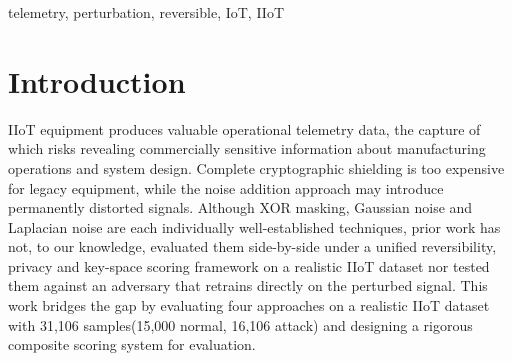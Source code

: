 \documentclass[conference]{IEEEtran}
\begin{document}
\begin{abstract}
IIoT(Industrial Internet of Things) systems constantly stream telemetry data from sensors and machinery to the cloud, posing serious privacy and security challenges. Conventional encryption methods are computationally too expensive for legacy devices. Our measurements show AES-128 requires roughly 59 - 70 times more per-packet latency than our lightweight scheme under simulated Modbus streaming conditions, while common noise-based perturbation methods irreversibly distort data. We introduce and evaluate a lightweight, fully reversible data perturbation pipeline for IIoT telemetry, contributing a composite reversibility privacy-key-space scoring framework for comparing perturbation strategies under realistic legacy-device constraints. To assess the balance between privacy and utility, a dataset comprising 31,106 IIoT intrusion detection samples covering five distinct attack categories was employed. After training a classifier that achieved a 98.47\% binary classification accuracy on original data, we evaluated four different perturbation techniques: Gaussian noise, Laplacian noise, XOR 16-bit, and XOR 64-bit against both a static and an adaptive adversary.

\end{abstract}

\begin{IEEEkeywords}
telemetry, perturbation, reversible, IoT, IIoT
\end{IEEEkeywords}

\section{Introduction}
IIoT equipment produces valuable operational telemetry data, the capture of which risks revealing commercially sensitive information about manufacturing operations and system design. Complete cryptographic shielding is too expensive for legacy equipment, while the noise addition approach may introduce permanently distorted signals. Although XOR masking, Gaussian noise and Laplacian noise are each individually well-established techniques, prior work has not, to our knowledge, evaluated them side-by-side under a unified reversibility, privacy and key-space scoring framework on a realistic IIoT dataset nor tested them against an adversary that retrains directly on the perturbed signal. This work bridges the gap by evaluating four approaches on a realistic IIoT dataset with 31,106 samples(15,000 normal, 16,106 attack) and designing a rigorous composite scoring system for evaluation. 
\end{document}

